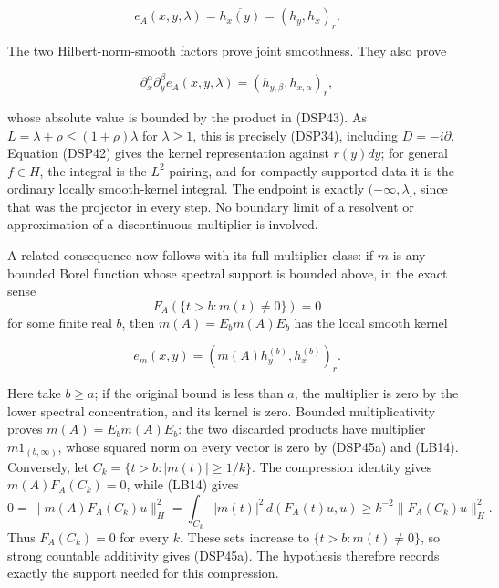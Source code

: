 \documentclass[
  11pt,
]{article}
\begin{document}
\[
 e_A(x,y,\lambda)=\overline{h_x(y)}=(h_y,h_x)_r.
 \tag{DSP44}
\]

The two Hilbert-norm-smooth factors prove joint smoothness. They also
prove

\[
 \partial_x^\alpha\partial_y^\beta e_A(x,y,\lambda)
 =(h_{y,\beta},h_{x,\alpha})_r,
\]

whose absolute value is bounded by the product in (DSP43). As
\(L=\lambda+\rho\leq(1+\rho)\lambda\) for \(\lambda\geq1\), this is
precisely (DSP34), including \(D=-i\partial\). Equation (DSP42) gives
the kernel representation against \(r(y)dy\); for general \(f\in H\),
the integral is the \(L^2\) pairing, and for compactly supported data it
is the ordinary locally smooth-kernel integral. The endpoint is exactly
\((-\infty,\lambda]\), since that was the projector in every step. No
boundary limit of a resolvent or approximation of a discontinuous
multiplier is involved.

A related consequence now follows with its full multiplier class: if
\(m\) is any bounded Borel function whose spectral support is bounded
above, in the exact sense \[
 F_A(\{t>b:m(t)\ne0\})=0
 \tag{DSP45a}
\] for some finite real \(b\), then \(m(A)=E_bm(A)E_b\) has the local
smooth kernel

\[
 e_m(x,y)=(m(A)h_y^{(b)},h_x^{(b)})_r.
 \tag{DSP45}
\]

Here take \(b\geq a\); if the original bound is less than \(a\), the
multiplier is zero by the lower spectral concentration, and its kernel
is zero. Bounded multiplicativity proves \(m(A)=E_bm(A)E_b\): the two
discarded products have multiplier \(m1_{(b,\infty)}\), whose squared
norm on every vector is zero by (DSP45a) and (LB14). Conversely, let
\(C_k=\{t>b:|m(t)|\geq1/k\}\). The compression identity gives
\(m(A)F_A(C_k)=0\), while (LB14) gives \[
 0=\|m(A)F_A(C_k)u\|_H^2
   =\int_{C_k}|m(t)|^2\,d(F_A(t)u,u)
   \geq k^{-2}\|F_A(C_k)u\|_H^2 .
 \tag{DSP45c}
\] Thus \(F_A(C_k)=0\) for every \(k\). These sets increase to
\(\{t>b:m(t)\ne0\}\), so strong countable additivity gives (DSP45a). The
hypothesis therefore records exactly the support needed for this
compression.
\end{document}
